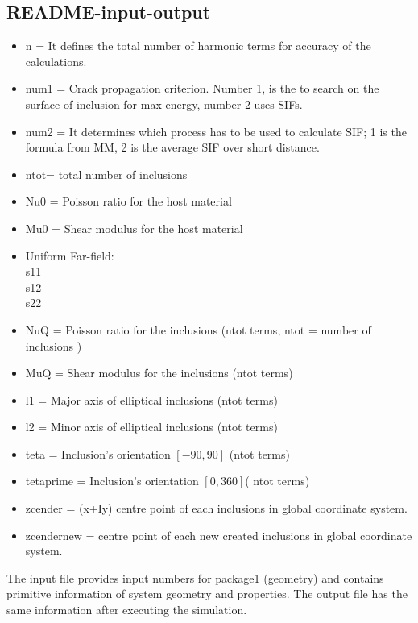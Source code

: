\documentclass[12pt]{article}
\numberwithin{equation}{subsection}
\begin{document}
\clearpage
\subsection{README-input-output}

\begin{itemize}
\item n = It defines the total number of harmonic terms for accuracy of the calculations.

\item num1 = Crack propagation criterion. Number 1, is the to search on the surface of inclusion for max energy, number 2 uses SIFs.

\item num2 = It determines which process has to be used to calculate SIF; 1 is the formula from MM, 2 is the average SIF over short distance.

\item ntot= total number of inclusions

\item Nu0 = Poisson ratio for the host material
\item Mu0 = Shear modulus for the host material 

\item Uniform Far-field:\\
s11\\
s12\\
s22

\item NuQ = Poisson ratio for the inclusions (ntot terms, ntot = number of inclusions )
\item MuQ = Shear modulus for the inclusions (ntot terms)

\item l1 = Major axis of elliptical inclusions (ntot terms)
\item l2 = Minor axis of elliptical inclusions (ntot terms)
\item teta = Inclusion’s orientation $[-90,90]$ (ntot terms)
\item tetaprime = Inclusion’s orientation $ [0,360]$( ntot terms)
\item zcender = (x+Iy) centre point of each inclusions in global coordinate system.
\item zcendernew = centre point of each new created inclusions in global coordinate system.

\end{itemize}


The input file provides input numbers for package1 (geometry)  and contains primitive information of system geometry and properties. The output file has the same information after executing the simulation. 
\end{document}
